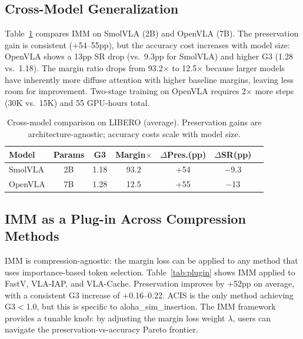 \documentclass[10pt,twocolumn]{article}
\begin{document}
\subsection{Cross-Model Generalization}
\label{sec:cross_model}

Table~\ref{tab:cross_model} compares IMM on SmolVLA (2B) and OpenVLA (7B). The preservation gain is consistent ($+$54--55pp), but the accuracy cost increases with model size: OpenVLA shows a 13pp SR drop (vs.\ 9.3pp for SmolVLA) and higher G3 (1.28 vs.\ 1.18). The margin ratio drops from 93.2$\times$ to 12.5$\times$ because larger models have inherently more diffuse attention with higher baseline margins, leaving less room for improvement. Two-stage training on OpenVLA requires 2$\times$ more steps (30K vs.\ 15K) and 55 GPU-hours total.

\begin{table}[t]
\centering
\caption{Cross-model comparison on LIBERO (average). Preservation gains are architecture-agnostic; accuracy costs scale with model size.}
\label{tab:cross_model}
\small
\begin{tabular}{@{}lcccccc@{}}
\toprule
Model & Params & G3 & Margin$\times$ & $\Delta$Pres.(pp) & $\Delta$SR(pp) \\
\midrule
SmolVLA & 2B  & 1.18 & 93.2 & +54 & $-$9.3 \\
OpenVLA & 7B  & 1.28 & 12.5 & +55 & $-$13 \\
\bottomrule
\end{tabular}
\end{table}

\subsection{IMM as a Plug-in Across Compression Methods}
\label{sec:cross_compress}

IMM is compression-agnostic: the margin loss can be applied to any method that uses importance-based token selection. Table~\ref{tab:plugin} shows IMM applied to FastV, VLA-IAP, and VLA-Cache. Preservation improves by $+$52pp on average, with a consistent G3 increase of $+$0.16--0.22. ACIS is the only method achieving G3$<$1.0, but this is specific to aloha\_sim\_insertion. The IMM framework provides a tunable knob: by adjusting the margin loss weight $\lambda$, users can navigate the preservation-vs-accuracy Pareto frontier.
\end{document}
